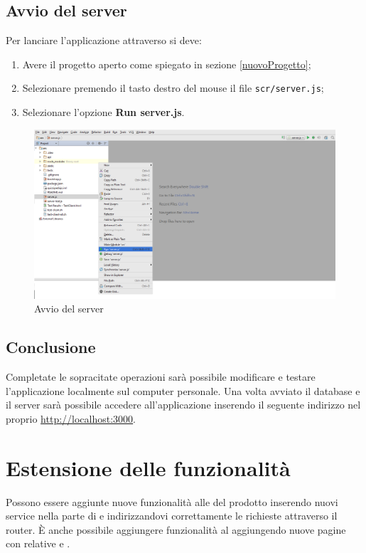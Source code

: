 \documentclass[12pt,a4paper]{article}
\begin{document}
	\subsection{Avvio del server}
	Per lanciare l'applicazione attraverso   si deve:
	\begin{enumerate}
		\item Avere il progetto aperto come spiegato in sezione \ref{nuovoProgetto};
		\item Selezionare premendo il tasto destro del mouse il file \texttt{scr/server.js};
		\item Selezionare l'opzione \textbf{Run server.js}.
	\end{enumerate}
	\begin{center}
		\begin{figure}[H]
			\includegraphics[max width=\textwidth]{../img/manualeSviluppatore/runServer.png}
			\caption{Avvio del server}
		\end{figure}
	\end{center}
		
	\subsection{Conclusione}
	Completate le sopracitate operazioni sarà possibile modificare e testare l'applicazione localmente sul computer personale.
	Una volta avviato il database e il server  sarà possibile accedere all'applicazione inserendo il seguente indirizzo nel proprio  \url{http://localhost:3000}.
	
	\newpage
	\section{Estensione delle funzionalità}
	Possono essere aggiunte nuove funzionalità alle  del prodotto inserendo nuovi service nella parte di  e indirizzandovi correttamente le richieste attraverso il router. È anche possibile aggiungere funzionalità al  aggiungendo nuove pagine con relative  e .
\end{document}
